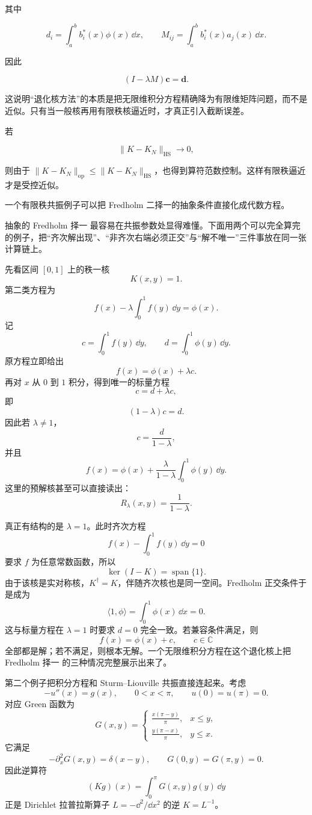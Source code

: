 其中

\[
d_i=\int_a^b b_i^*(x)\phi(x)\,\dd x,
\qquad
M_{ij}=\int_a^b b_i^*(x)a_j(x)\,\dd x.
\]

因此

\[
(I-\lambda M)\mathbf c=\mathbf d.
\]

这说明``退化核方法''的本质是把无限维积分方程精确降为有限维矩阵问题，而不是近似。只有当一般核再用有限秩核逼近时，才真正引入截断误差。

若

\[
\|K-K_N\|_{\mathrm{HS}}\to0,
\]

则由于 $\|K-K_N\|_{\mathrm{op}}\le\|K-K_N\|_{\mathrm{HS}}$，也得到算符范数控制。这样有限秩逼近才是受控近似。

一个有限秩共振例子可以把 Fredholm 二择一的抽象条件直接化成代数方程。

抽象的 Fredholm 择一 最容易在共振参数处显得难懂。下面用两个可以完全算完的例子，把``齐次解出现''、``非齐次右端必须正交''与``解不唯一''三件事放在同一张计算链上。

先看区间 $[0,1]$ 上的秩一核
\[
K(x,y)=1.
\]
第二类方程为
\begin{equation*}f(x)-\lambda\int_0^1 f(y)\,\dd y=\phi(x).\end{equation*}
记
\[
c=\int_0^1f(y)\,\dd y,
\qquad
d=\int_0^1\phi(y)\,\dd y.
\]
原方程立即给出
\[
f(x)=\phi(x)+\lambda c.
\]
再对 $x$ 从 $0$ 到 $1$ 积分，得到唯一的标量方程
\[
c=d+\lambda c,
\]
即
\[
(1-\lambda)c=d.
\]
因此若 $\lambda\neq1$，
\[
c=\frac{d}{1-\lambda},
\]
并且
\begin{equation*}\boxed{
f(x)=\phi(x)+\frac{\lambda}{1-\lambda}
\int_0^1\phi(y)\,\dd y
}.\end{equation*}
这里的预解核甚至可以直接读出：
\[
R_\lambda(x,y)=\frac1{1-\lambda}.
\]

真正有结构的是 $\lambda=1$。此时齐次方程
\[
f(x)-\int_0^1f(y)\,\dd y=0
\]
要求 $f$ 为任意常数函数，所以
\[
\ker(I-K)=\operatorname{span}\{1\}.
\]
由于该核是实对称核，$K^\dagger=K$，伴随齐次核也是同一空间。Fredholm 正交条件于是成为
\[
\langle1,\phi\rangle
=\int_0^1\phi(x)\,\dd x=0.
\]
这与标量方程在 $\lambda=1$ 时要求 $d=0$ 完全一致。若兼容条件满足，则
\[
f(x)=\phi(x)+c,
\qquad c\in\mathbb C
\]
全部都是解；若不满足，则根本无解。一个无限维积分方程在这个退化核上把 Fredholm 择一 的三种情况完整展示出来了。

第二个例子把积分方程和 Sturm--Liouville 共振直接连起来。考虑
\[
-u''(x)=g(x),
\qquad 0<x<\pi,
\qquad u(0)=u(\pi)=0.
\]
对应 Green 函数为
\[
G(x,y)=
\begin{cases}
\displaystyle \frac{x(\pi-y)}{\pi},&x\le y,\\[1ex]
\displaystyle \frac{y(\pi-x)}{\pi},&y\le x.
\end{cases}
\]
它满足
\[
-\partial_x^2G(x,y)=\delta(x-y),
\qquad G(0,y)=G(\pi,y)=0.
\]
因此逆算符
\[
(Kg)(x)=\int_0^\pi G(x,y)g(y)\,\dd y
\]
正是 Dirichlet 拉普拉斯算子 $L=-\dd^2/\dd x^2$ 的逆 $K=L^{-1}$。


